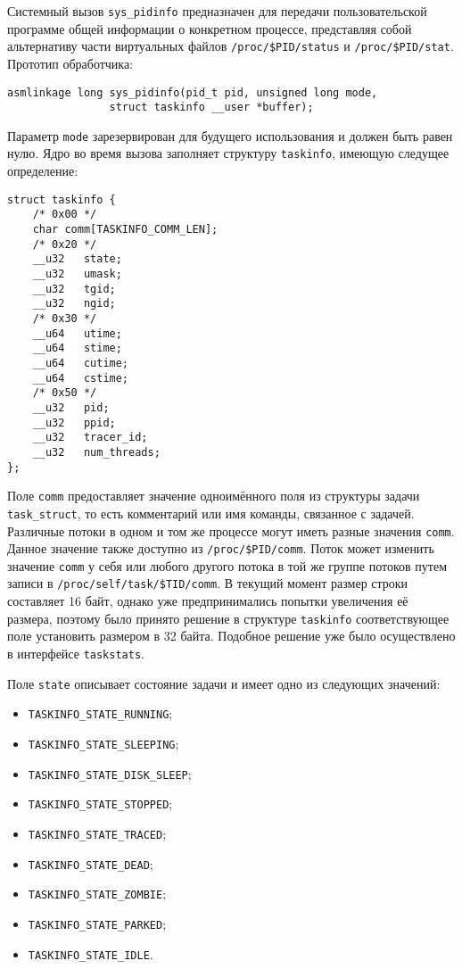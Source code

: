 Системный вызов \texttt{sys\_pidinfo} предназначен для передачи пользовательской
программе общей информации о конкретном процессе, представляя собой альтернативу
части виртуальных файлов \texttt{/proc/\$PID/status} и \texttt{/proc/\$PID/stat}. Прототип
обработчика:

\medskip
\begin{lstlisting}[style=cstyle]
asmlinkage long sys_pidinfo(pid_t pid, unsigned long mode,
			    struct taskinfo __user *buffer);
\end{lstlisting}
\medskip

Параметр \texttt{mode} зарезервирован для будущего использования и должен быть
равен нулю. Ядро во время вызова заполняет структуру \texttt{taskinfo}, имеющую
следущее определение:

\medskip
\begin{lstlisting}[style=cstyle]
struct taskinfo {
	/* 0x00 */
	char comm[TASKINFO_COMM_LEN];
	/* 0x20 */
	__u32	state;
	__u32	umask;
	__u32	tgid;
	__u32	ngid;
	/* 0x30 */
	__u64	utime;
	__u64	stime;
	__u64	cutime;
	__u64	cstime;
	/* 0x50 */
	__u32	pid;
	__u32	ppid;
	__u32	tracer_id;
	__u32	num_threads;
};
\end{lstlisting}
\medskip

Поле \texttt{comm} предоставляет значение одноимённого поля из структуры задачи
\texttt{task\_struct}, то есть комментарий или имя команды, связанное с
задачей. Различные потоки в одном и том же процессе могут иметь разные значения
\texttt{comm}. Данное значение также доступно из
\texttt{/proc/\$PID/comm}. Поток может изменить значение \texttt{comm} у себя
или любого другого потока в той же группе потоков путем записи в
\texttt{/proc/self/task/\$TID/comm}. В текущий момент размер строки составляет
16 байт, однако уже предпринимались попытки увеличения её размера, поэтому было
принято решение в структуре \texttt{taskinfo} соответствующее поле установить
размером в 32 байта. Подобное решение уже было осуществлено в интерфейсе
\texttt{taskstats}.

Поле \texttt{state} описывает состояние задачи и имеет одно из следующих
значений:
\begin{itemize}
\item \texttt{TASKINFO\_STATE\_RUNNING};
\item \texttt{TASKINFO\_STATE\_SLEEPING};
\item \texttt{TASKINFO\_STATE\_DISK\_SLEEP};
\item \texttt{TASKINFO\_STATE\_STOPPED};
\item \texttt{TASKINFO\_STATE\_TRACED};
\item \texttt{TASKINFO\_STATE\_DEAD};
\item \texttt{TASKINFO\_STATE\_ZOMBIE};
\item \texttt{TASKINFO\_STATE\_PARKED};
\item \texttt{TASKINFO\_STATE\_IDLE}.
\end{itemize}

